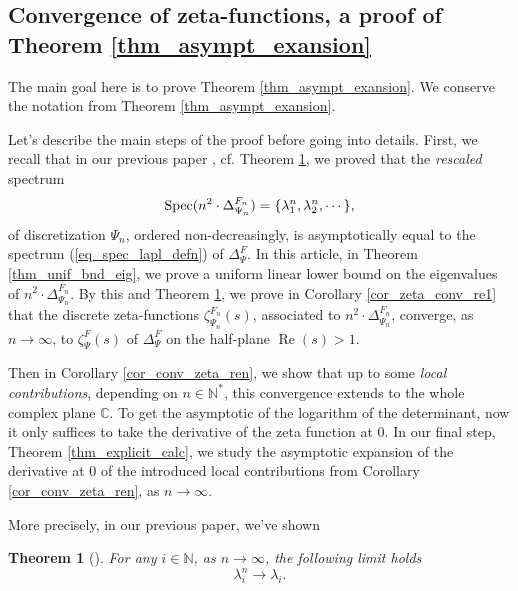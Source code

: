 \documentclass[12pt]{article}
\numberwithin{equation}{section}
\theoremstyle{theorem}
\newtheorem{thm}{Theorem}[section]
\theoremstyle{definition}
\theoremstyle{remark}
\newcommand{\comp}{\mathbb{C}}
\newcommand{\nat}{\mathbb{N}}
\newcommand{\spec}{{\rm{Spec}}}
\newcommand{\laplcomp}{\Delta}
\renewcommand{\Re}{\operatorname{Re}}
\begin{document}
	
	
	\subsection{Convergence of zeta-functions, a proof of Theorem \ref{thm_asympt_exansion}}\label{sect_idea_proof}
	The main goal here is to prove Theorem \ref{thm_asympt_exansion}. We conserve the notation from Theorem \ref{thm_asympt_exansion}. 
	\par 
	Let's describe the main steps of the proof before going into details.
	First, we recall that in our previous paper \cite[Theorem 1.1]{FinFinDiffer}, cf. Theorem \ref{thm_eigval_convergence}, we proved that the \textit{rescaled} spectrum 
	\begin{equation}
		\spec(n^2 \cdot \laplcomp_{\Psi_n}^{F_n}) = \{\lambda_1^{n}, \lambda_2^{n}, \cdots \},
	\end{equation}
	of discretization $\Psi_n$, ordered non-decreasingly, is asymptotically equal to the spectrum (\ref{eq_spec_lapl_defn}) of $\laplcomp_{\Psi}^{F}$. 
	In this article, in Theorem \ref{thm_unif_bnd_eig}, we  prove a uniform linear lower bound on the eigenvalues of $n^2 \cdot \laplcomp_{\Psi_n}^{F_n}$. By this and Theorem \ref{thm_eigval_convergence}, we prove in Corollary \ref{cor_zeta_conv_re1} that the discrete zeta-functions $\zeta_{\Psi_n}^{F_n}(s)$, associated to $n^2 \cdot \laplcomp_{\Psi_n}^{F_n}$, converge, as $n \to \infty$, to $\zeta_{\Psi}^{F}(s)$ of $\laplcomp_{\Psi}^{F}$ on the half-plane $\Re(s) > 1$.
	\par Then in Corollary \ref{cor_conv_zeta_ren}, we show that up to some \textit{local contributions}, depending on $n \in \nat^*$, this convergence extends to the whole complex plane $\comp$.
	To get the asymptotic of the logarithm of the determinant, now it only suffices to take the derivative of the zeta function at $0$.
	In our final step, Theorem \ref{thm_explicit_calc}, we study the asymptotic expansion of the derivative at $0$ of the introduced local contributions from Corollary \ref{cor_conv_zeta_ren}, as $n \to \infty$.
	\par More precisely, in our previous paper, we've shown
	\begin{thm}[{\cite[Theorem 1.1]{FinFinDiffer}}]\label{thm_eigval_convergence}
		For any $i \in \nat$, as $n \to \infty$, the following limit holds
		\begin{equation}\label{eq_eigval_convergence}
			\lambda_i^{n} \to \lambda_i.
		\end{equation}
	\end{thm}
\end{document}
